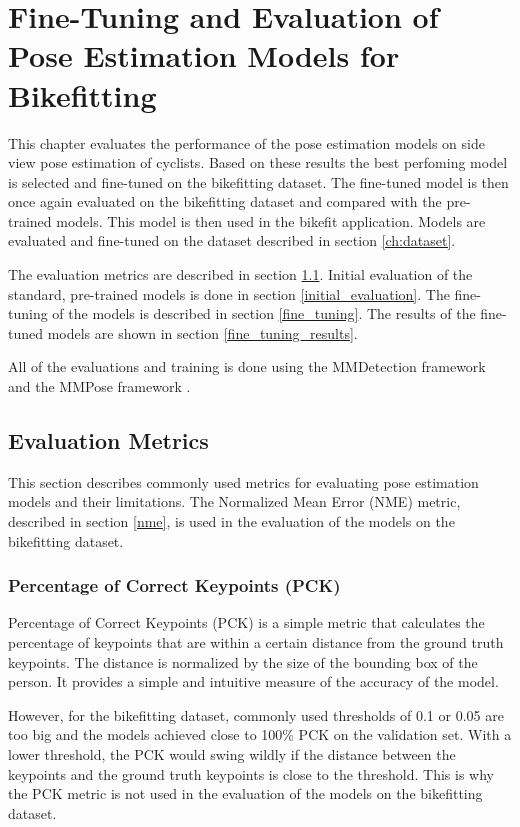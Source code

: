 
\chapter{Fine-Tuning and Evaluation of Pose Estimation Models for Bikefitting}
\label{ch:fine_tuning}

This chapter evaluates the performance of the pose estimation models on side view pose estimation of cyclists. Based on these results the best perfoming model is selected and fine-tuned on the bikefitting dataset. The fine-tuned model is then once again evaluated on the bikefitting dataset and compared with the pre-trained models. This model is then used in the bikefit application. Models are evaluated and fine-tuned on the dataset described in section \ref{ch:dataset}.

The evaluation metrics are described in section \ref{evaluation_metrics}. Initial evaluation of the standard, pre-trained models is done in section \ref{initial_evaluation}. The fine-tuning of the models is described in section \ref{fine_tuning}. The results of the fine-tuned models are shown in section \ref{fine_tuning_results}.

All of the evaluations and training is done using the MMDetection framework \cite{mmdetection} and the MMPose framework \cite{mmpose2020}.

\section{Evaluation Metrics}
\label{evaluation_metrics}
This section describes commonly used metrics for evaluating pose estimation models and their limitations. The Normalized Mean Error (NME) metric, described in section \ref{nme}, is used in the evaluation of the models on the bikefitting dataset.



\subsection{Percentage of Correct Keypoints (PCK)}
Percentage of Correct Keypoints (PCK) is a simple metric that calculates the percentage of keypoints that are within a certain distance from the ground truth keypoints. The distance is normalized by the size of the bounding box of the person. It provides a simple and intuitive measure of the accuracy of the model.

However, for the bikefitting dataset, commonly used thresholds of 0.1 or 0.05 are too big and the models achieved close to 100\% PCK on the validation set. With a lower threshold, the PCK would swing wildly if the distance between the keypoints and the ground truth keypoints is close to the threshold. This is why the PCK metric is not used in the evaluation of the models on the bikefitting dataset.

